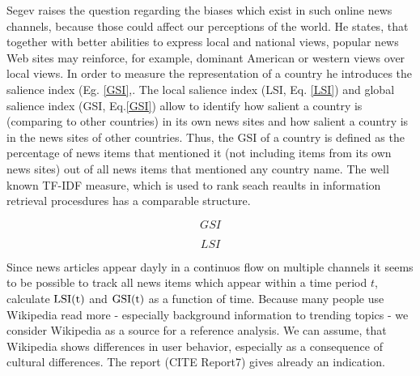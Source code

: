 \documentclass[a4paper,10pt]{scrbook}
\begin{document}
%
%

Segev raises the question regarding the biases which exist in such online news channels, because those could affect our perceptions of the world. He states, that together with better abilities to express local and national views, popular news Web sites may reinforce, for example, dominant American or western views over local views. In order to measure the representation of a country he introduces the salience index (Eg. \ref{GSI},. The local salience index (LSI, Eq. \ref{LSI}) and global salience index (GSI, Eq.\ref{GSI}) allow to identify how salient a country is (comparing to other countries) in its own news sites and how salient a country is in the news sites of other countries. Thus, the GSI of a country is defined as the percentage of news items that mentioned it (not including items from its own news sites) out of all news items that mentioned any country name. The well known TF-IDF measure, which is used to rank seach reaults in information retrieval procesdures has a comparable structure.

\begin{equation}
\label{GSI}
GSI
\end{equation}

\begin{equation}
\label{LSI}
LSI
\end{equation}

Since news articles appear dayly in a continuos flow on multiple channels it seems to be possible to track all news items which appear within a time period $t$, calculate $\rm {LSI}(t)$ and $\rm {GSI}(t)$ as a function of time. Because many people use Wikipedia read more - especially background information to trending topics - we consider Wikipedia as a source for a reference analysis. We can assume, that Wikipedia shows differences in user behavior, especially as a consequence of cultural differences. The report (CITE Report7) gives already an indication. 
\end{document}
